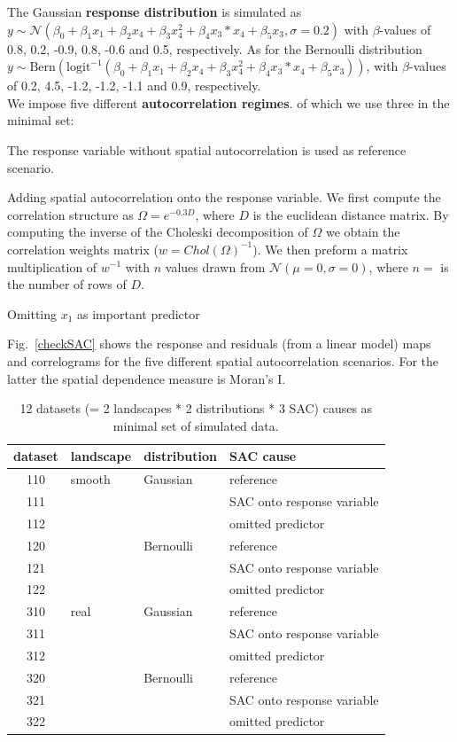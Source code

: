 \documentclass{article}
\begin{document}
The Gaussian  \textbf{response distribution} is simulated as $y \sim \mathcal{N}(\beta_0 + \beta_1x_1 + \beta_2x_4 + \beta_3x_4^2 + \beta_4x_3*x_4 + \beta_5x_3, \sigma=0.2)$ with $\beta$-values of 0.8, 0.2, -0.9, 0.8, -0.6 and 0.5, respectively.
As for the Bernoulli distribution $y \sim \textrm{Bern}(\textrm{logit}^{-1}(\beta_0 + \beta_1x_1 + \beta_2x_4 + \beta_3x_4^2 + \beta_4x_3*x_4 + \beta_5x_3))$, with $\beta$-values of 0.2, 4.5, -1.2, -1.2, -1.1 and 0.9, respectively.\\
 
We impose five different \textbf{autocorrelation regimes}. of which we use three in the minimal set:
\begin{description}
	\setlength\itemsep{-0.2em}
	\item[SAC cause 0] The response variable without spatial autocorrelation is used as reference scenario.
	\item[SAC cause 1] Adding spatial autocorrelation onto the response variable. We first compute the correlation structure as $\Omega = e^{-0.3D}$, where $D$ is the euclidean distance matrix. By computing the inverse of the Choleski decomposition of $\Omega$ we obtain the correlation weights matrix ($w=Chol(\Omega)^{-1}$). We then preform a matrix multiplication of $w^{-1}$ with $n$ values drawn from $\mathcal{N}(\mu=0, \sigma=0)$, where $n=$ is the number of rows of $D$.
	\item[SAC cause 2] Omitting $x_1$ as important predictor
\end{description}

Fig.~\ref{checkSAC} shows the response and residuals (from a linear model) maps and correlograms for the five different spatial autocorrelation scenarios. For the latter the spatial dependence measure is Moran's I.




\begin{table}[b!]
	\centering
	\caption{12 datasets (=  2 landscapes * 2 distributions * 3 SAC) causes as minimal set of simulated data.\label{minimalset}}
	\begin{tabular}{clll}
		\toprule
		dataset & landscape & distribution & SAC cause\\
		\midrule
		110 & smooth & Gaussian & reference\\
		111 & & & SAC onto response variable\\
		112 & & & omitted predictor\\
		120 & & Bernoulli & reference\\
		121 & & & SAC onto response variable\\
		122 & & & omitted predictor\\
		310 & real & Gaussian & reference\\
		311 & & & SAC onto response variable\\
		312 & & & omitted predictor\\
		320 & & Bernoulli & reference\\
		321 & & & SAC onto response variable\\
		322 & & & omitted predictor\\
		\bottomrule
	\end{tabular}
\end{table}  
	
\end{document}
